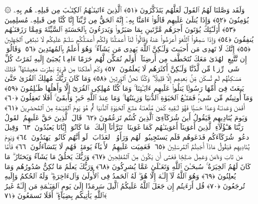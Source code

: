  ۞ وَلَقَد وَصَّلنَا لَهُمُ ٱلقَولَ لَعَلَّهُم يَتَذَكَّرُونَ ﴿٥١﴾
 ٱلَّذِينَ ءَاتَينَـٰهُمُ ٱلكِتَـٰبَ مِن قَبلِهِۦ هُم بِهِۦ يُؤمِنُونَ ﴿٥٢﴾
 وَإِذَا يُتلَىٰ عَلَيهِم قَالُوٓا۟ ءَامَنَّا بِهِۦٓ إِنَّهُ ٱلحَقُّ مِن رَّبِّنَآ إِنَّا كُنَّا مِن قَبلِهِۦ مُسلِمِينَ ﴿٥٣﴾
 أُو۟لَـٰٓئِكَ يُؤتَونَ أَجرَهُم مَّرَّتَينِ بِمَا صَبَرُوا۟ وَيَدرَءُونَ بِٱلحَسَنَةِ ٱلسَّيِّئَةَ وَمِمَّا رَزَقنَـٰهُم يُنفِقُونَ ﴿٥٤﴾
 وَإِذَا سَمِعُوا۟ ٱللَّغوَ أَعرَضُوا۟ عَنهُ وَقَالُوا۟ لَنَآ أَعمَـٰلُنَا وَلَكُم أَعمَـٰلُكُم سَلَـٰمٌ عَلَيكُم لَا نَبتَغِى ٱلجَٰهِلِينَ ﴿٥٥﴾
 إِنَّكَ لَا تَهدِى مَن أَحبَبتَ وَلَـٰكِنَّ ٱللَّهَ يَهدِى مَن يَشَآءُ ۚ وَهُوَ أَعلَمُ بِٱلمُهتَدِينَ ﴿٥٦﴾
 وَقَالُوٓا۟ إِن نَّتَّبِعِ ٱلهُدَىٰ مَعَكَ نُتَخَطَّف مِن أَرضِنَآ ۚ أَوَلَم نُمَكِّن لَّهُم حَرَمًا ءَامِنًۭا يُجبَىٰٓ إِلَيهِ ثَمَرَٰتُ كُلِّ شَىءٍۢ رِّزقًۭا مِّن لَّدُنَّا وَلَـٰكِنَّ أَكثَرَهُم لَا يَعلَمُونَ ﴿٥٧﴾
 وَكَم أَهلَكنَا مِن قَريَةٍۭ بَطِرَت مَعِيشَتَهَا ۖ فَتِلكَ مَسَـٰكِنُهُم لَم تُسكَن مِّنۢ بَعدِهِم إِلَّا قَلِيلًۭا ۖ وَكُنَّا نَحنُ ٱلوَٟرِثِينَ ﴿٥٨﴾
 وَمَا كَانَ رَبُّكَ مُهلِكَ ٱلقُرَىٰ حَتَّىٰ يَبعَثَ فِىٓ أُمِّهَا رَسُولًۭا يَتلُوا۟ عَلَيهِم ءَايَـٰتِنَا ۚ وَمَا كُنَّا مُهلِكِى ٱلقُرَىٰٓ إِلَّا وَأَهلُهَا ظَـٰلِمُونَ ﴿٥٩﴾
 وَمَآ أُوتِيتُم مِّن شَىءٍۢ فَمَتَـٰعُ ٱلحَيَوٰةِ ٱلدُّنيَا وَزِينَتُهَا ۚ وَمَا عِندَ ٱللَّهِ خَيرٌۭ وَأَبقَىٰٓ ۚ أَفَلَا تَعقِلُونَ ﴿٦٠﴾
 أَفَمَن وَعَدنَـٰهُ وَعدًا حَسَنًۭا فَهُوَ لَـٰقِيهِ كَمَن مَّتَّعنَـٰهُ مَتَـٰعَ ٱلحَيَوٰةِ ٱلدُّنيَا ثُمَّ هُوَ يَومَ ٱلقِيَـٰمَةِ مِنَ ٱلمُحضَرِينَ ﴿٦١﴾
 وَيَومَ يُنَادِيهِم فَيَقُولُ أَينَ شُرَكَآءِىَ ٱلَّذِينَ كُنتُم تَزعُمُونَ ﴿٦٢﴾
 قَالَ ٱلَّذِينَ حَقَّ عَلَيهِمُ ٱلقَولُ رَبَّنَا هَـٰٓؤُلَآءِ ٱلَّذِينَ أَغوَينَآ أَغوَينَـٰهُم كَمَا غَوَينَا ۖ تَبَرَّأنَآ إِلَيكَ ۖ مَا كَانُوٓا۟ إِيَّانَا يَعبُدُونَ ﴿٦٣﴾
 وَقِيلَ ٱدعُوا۟ شُرَكَآءَكُم فَدَعَوهُم فَلَم يَستَجِيبُوا۟ لَهُم وَرَأَوُا۟ ٱلعَذَابَ ۚ لَو أَنَّهُم كَانُوا۟ يَهتَدُونَ ﴿٦٤﴾
 وَيَومَ يُنَادِيهِم فَيَقُولُ مَاذَآ أَجَبتُمُ ٱلمُرسَلِينَ ﴿٦٥﴾
 فَعَمِيَت عَلَيهِمُ ٱلأَنۢبَآءُ يَومَئِذٍۢ فَهُم لَا يَتَسَآءَلُونَ ﴿٦٦﴾
 فَأَمَّا مَن تَابَ وَءَامَنَ وَعَمِلَ صَـٰلِحًۭا فَعَسَىٰٓ أَن يَكُونَ مِنَ ٱلمُفلِحِينَ ﴿٦٧﴾
 وَرَبُّكَ يَخلُقُ مَا يَشَآءُ وَيَختَارُ ۗ مَا كَانَ لَهُمُ ٱلخِيَرَةُ ۚ سُبحَـٰنَ ٱللَّهِ وَتَعَـٰلَىٰ عَمَّا يُشرِكُونَ ﴿٦٨﴾
 وَرَبُّكَ يَعلَمُ مَا تُكِنُّ صُدُورُهُم وَمَا يُعلِنُونَ ﴿٦٩﴾
 وَهُوَ ٱللَّهُ لَآ إِلَـٰهَ إِلَّا هُوَ ۖ لَهُ ٱلحَمدُ فِى ٱلأُولَىٰ وَٱلءَاخِرَةِ ۖ وَلَهُ ٱلحُكمُ وَإِلَيهِ تُرجَعُونَ ﴿٧٠﴾
 قُل أَرَءَيتُم إِن جَعَلَ ٱللَّهُ عَلَيكُمُ ٱلَّيلَ سَرمَدًا إِلَىٰ يَومِ ٱلقِيَـٰمَةِ مَن إِلَـٰهٌ غَيرُ ٱللَّهِ يَأتِيكُم بِضِيَآءٍ ۖ أَفَلَا تَسمَعُونَ ﴿٧١﴾
